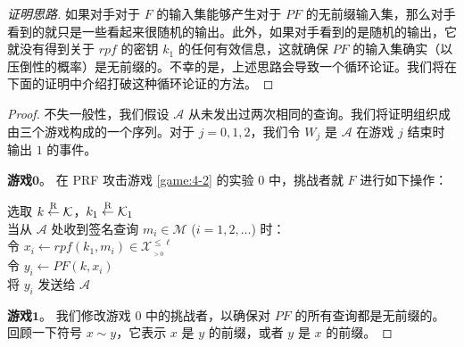 \begin{proof}[证明思路]
如果对手对于 $F$ 的输入集能够产生对于 $PF$ 的无前缀输入集，那么对手看到的就只是一些看起来很随机的输出。此外，如果对手看到的是随机的输出，它就没有得到关于 $rpf$ 的密钥 $k_1$ 的任何有效信息，这就确保 $PF$ 的输入集确实（以压倒性的概率）是无前缀的。不幸的是，上述思路会导致一个循环论证。我们将在下面的证明中介绍打破这种循环论证的方法。
\end{proof}

\begin{proof}
不失一般性，我们假设 $\mathcal{A}$ 从未发出过两次相同的查询。我们将证明组织成由三个游戏构成的一个序列。对于 $j=0,1,2$，我们令 $W_j$ 是 $\mathcal{A}$ 在游戏 $j$ 结束时输出 $1$ 的事件。

\vspace{5pt}

\noindent\textbf{游戏$\mathbf{0}$}。
在 PRF 攻击游戏 \ref{game:4-2} 的实验 $0$ 中，挑战者就 $F$ 进行如下操作：

\vspace{5pt}

\hspace*{5pt} 选取 $k\overset{\rm R}\leftarrow\mathcal{K}$，$k_1\overset{\rm R}\leftarrow\mathcal{K}_1$\\
\hspace*{26pt} 当从 $\mathcal{A}$ 处收到签名查询 $m_i\in\mathcal{M}$ ($i=1,2,\dots$) 时：\\
\hspace*{50pt} 令 $x_i\leftarrow rpf(k_1,m_i)\in\mathcal{X}^{\leq\ell}_{_{>0}}$\\
\hspace*{50pt} 令 $y_i\leftarrow PF(k,x_i)$\\
\hspace*{50pt} 将 $y_i$ 发送给 $\mathcal{A}$

\vspace{5pt}

\noindent\textbf{游戏$\mathbf{1}$}。
我们修改游戏 $0$ 中的挑战者，以确保对 $PF$ 的所有查询都是无前缀的。回顾一下符号 $x\sim y$，它表示 $x$ 是 $y$ 的前缀，或者 $y$ 是 $x$ 的前缀。

\vspace{5pt}


\end{proof}
